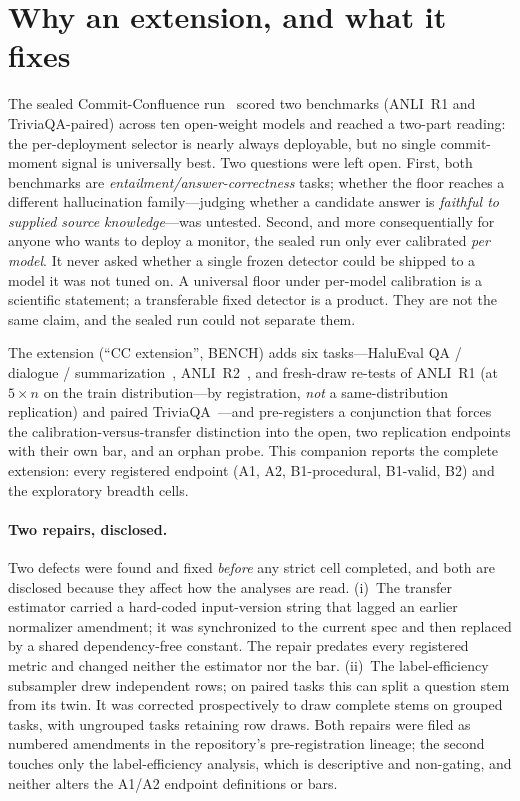 \documentclass[11pt]{article}
\begin{document}
\section{Why an extension, and what it fixes}

The sealed Commit-Confluence run~\cite{ccpaper} scored two benchmarks (ANLI~R1 and TriviaQA-paired) across ten
open-weight models and reached a two-part reading: the per-deployment selector is nearly always
deployable, but no single commit-moment signal is universally best. Two questions were left open.
First, both benchmarks are \emph{entailment/answer-correctness} tasks; whether the floor reaches a
different hallucination family---judging whether a candidate answer is \emph{faithful to supplied
source knowledge}---was untested. Second, and more consequentially for anyone who wants to deploy a
monitor, the sealed run only ever calibrated \emph{per model}. It never asked whether a single
frozen detector could be shipped to a model it was not tuned on. A universal floor under per-model
calibration is a scientific statement; a transferable fixed detector is a product. They are not the
same claim, and the sealed run could not separate them.

The extension (``CC extension'', BENCH) adds six tasks---HaluEval QA / dialogue /
summarization~\cite{halueval}, ANLI~R2~\cite{anli}, and fresh-draw re-tests of ANLI~R1 (at
$5\times n$ on the train distribution---by registration, \emph{not} a same-distribution
replication) and paired TriviaQA~\cite{triviaqa}---and pre-registers a conjunction that forces the
calibration-versus-transfer distinction into the open, two replication endpoints with their own
bar, and an orphan probe. This companion reports the complete extension: every registered endpoint
(A1, A2, B1-procedural, B1-valid, B2) and the exploratory breadth cells.

\paragraph{Two repairs, disclosed.} Two defects were found and fixed \emph{before} any strict cell
completed, and both are disclosed because they affect how the analyses are read. (i)~The transfer
estimator carried a hard-coded input-version string that lagged an earlier normalizer amendment; it
was synchronized to the current spec and then replaced by a shared dependency-free constant. The
repair predates every registered metric and changed neither the estimator nor the bar. (ii)~The
label-efficiency subsampler drew independent rows; on paired tasks this can split a question stem
from its twin. It was corrected prospectively to draw complete stems on grouped tasks, with ungrouped
tasks retaining row draws. Both repairs were filed as numbered amendments in the repository's
pre-registration lineage; the second touches only the label-efficiency analysis, which is descriptive
and non-gating, and neither alters the A1/A2 endpoint definitions or bars.
\end{document}
